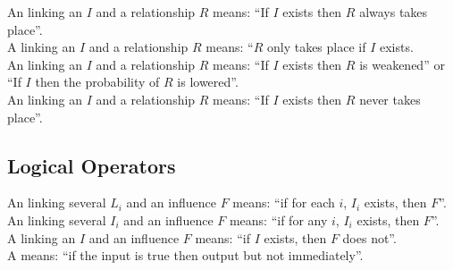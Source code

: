 \noindent
An  linking an  $I$ and a relationship $R$ means: ``If $I$ exists then $R$ always takes place''. 
\\[\baselineskip]

\noindent
A  linking an  $I$ and a relationship $R$ means: ``$R$ only takes place if $I$ exists. 
\\[\baselineskip]

\noindent
An  linking an  $I$ and a relationship $R$ means: ``If $I$ exists then $R$ is weakened'' or ``If $I$ then the probability of $R$ is lowered''. 
\\[\baselineskip]

\noindent
An  linking an  $I$ and a relationship $R$ means: ``If $I$ exists then $R$ never takes place''. 
\\[\baselineskip]

\subsection{Logical Operators}

An  linking several  $L_i$ and an influence $F$ means: ``if for each $i$, $I_i$ exists, then $F$''.\\[\baselineskip]

\noindent
An  linking several  $I_i$ and an influence $F$ means: ``if for any $i$, $I_i$ exists, then $F$''.\\[\baselineskip]

\noindent
A  linking an  $I$ and an influence $F$ means: ``if $I$ exists, then $F$ does not''.\\[\baselineskip]

\noindent
A  means: ``if the input is true then output but not immediately''.\\[\baselineskip]


\normalcolor

